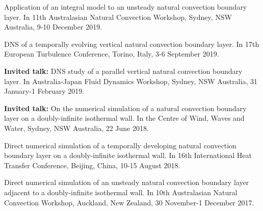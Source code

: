 \documentclass[letterpaper, 10pt]{article}
\newenvironment{changemargin}[2]{%
  \begin{list}{}{%
      \setlength{\topsep}{0pt}%
      \setlength{\leftmargin}{#1}%
      \setlength{\rightmargin}{#2}%
      \setlength{\listparindent}{\parindent}%
      \setlength{\itemindent}{\parindent}%
      \setlength{\parsep}{\parskip}%
    }%
  \item[]}{\end{list}
}
\newenvironment{body} {
  \vspace*{-16pt}
  \begin{changemargin}{-0.25in}{-0.5in}
  }
  {\end{changemargin}
}
\begin{document}
\begin{body}
  Application of an integral model to an unsteady natural convection boundary layer. In 11th Australasian Natural Convection Workshop, Sydney, NSW Australia, 9-10 December 2019.
  
  \smallskip
  
  DNS of a temporally evolving vertical natural convection boundary layer. In 17th European Turbulence Conference, Torino, Italy, 3-6 September 2019.
  
  \smallskip
  
  {\bf Invited talk: } DNS study of a parallel vertical natural convection boundary layer. In Australia-Japan Fluid Dynamics Workshop, Sydney, NSW Australia, 31 January-1 February 2019.
  
  \smallskip
  
  {\bf Invited talk: } On the numerical simulation of a natural convection boundary layer on a doubly-infinite isothermal wall. In the Centre of Wind, Waves and Water, Sydney, NSW Australia, 22 June 2018.
  
  \smallskip
  
  Direct numerical simulation of a temporally developing natural convection boundary layer on a doubly-infinite isothermal wall. In 16th International Heat Transfer Conference, Beijing, China, 10-15 August 2018. 
  
  \smallskip
  
  Direct numerical simulation of an unsteady natural convection boundary layer adjacent to a doubly-infinite isothermal wall. In 10th Australasian Natural Convection Workshop, Auckland, New Zealand, 30 November-1 December 2017.

\end{body}
\smallskip
\end{document}
